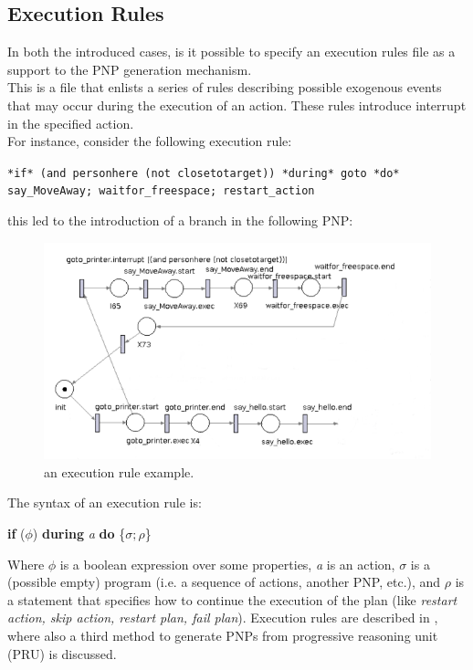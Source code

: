 \documentclass[pdftex,12pt,a4paper]{report}
\begin{document}
\subsection{Execution Rules}
In both the introduced cases, is it possible to specify an execution rules file as a support to the PNP generation mechanism. \\
This is a file that enlists a series of rules describing possible exogenous events that may occur during the execution of an action. These rules introduce interrupt in the specified action. \\
\newline
For instance, consider the following execution rule:
\begin{center}
\texttt{*if* (and personhere (not closetotarget)) *during* goto *do* say\_MoveAway; waitfor\_freespace; restart\_action}
\end{center}
this led to the introduction of a branch in the following PNP:
\begin{figure}[H]
	\centering
	\includegraphics[scale=0.6]{images/er_example.png}
	\caption{an execution rule example.}
\end{figure}
\noindent The syntax of an execution rule is:
\begin{center}
\textbf{if} ($\phi$) \textbf{during} \textit{a} \textbf{do} \{$\sigma; \rho$\}
\end{center}
Where $\phi$ is a boolean expression over some properties, \textit{a} is an action, $\sigma$ is a (possible empty) program (i.e. a sequence of actions, another PNP, etc.), and $\rho$ is a statement that specifies how to continue the execution of the plan (like \textit{restart action, skip action, restart plan, fail plan}). Execution rules are described in \cite{iocchi2016practical},%
where also a third method to generate PNPs from progressive reasoning unit (PRU) is discussed.
\end{document}
